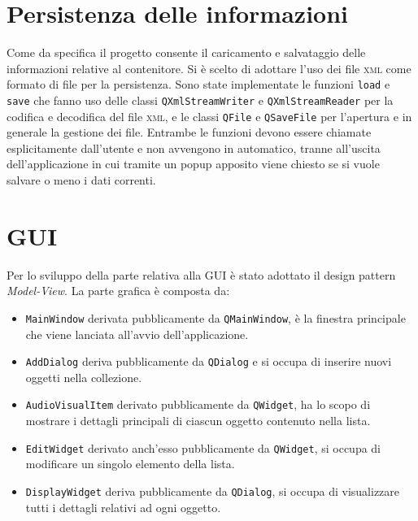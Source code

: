     \section*{Persistenza delle informazioni}
        Come da specifica il progetto consente il caricamento e salvataggio delle informazioni relative al contenitore. Si è scelto di adottare l'uso dei file \textsc{xml} come formato di file per la persistenza. \newline
        Sono state implementate le funzioni \texttt{load} e \texttt{save} che fanno uso delle classi \texttt{QXmlStreamWriter} e \texttt{QXmlStreamReader} per la codifica e decodifica del file \textsc{xml}, e le classi \texttt{QFile} e \texttt{QSaveFile} per l'apertura e in generale la gestione dei file. \newline
        Entrambe le funzioni devono essere chiamate esplicitamente dall'utente e non avvengono in automatico, tranne all'uscita dell'applicazione in cui tramite un popup apposito viene chiesto se si vuole salvare o meno i dati correnti.

    \section*{GUI}
        Per lo sviluppo della parte relativa alla GUI è stato adottato il design pattern \textit{Model-View}. \newline
        La parte grafica è composta da:
        \begin{itemize}
            \item \texttt{MainWindow} derivata pubblicamente da \texttt{QMainWindow}, è la finestra principale che viene lanciata all'avvio dell'applicazione.
            \item \texttt{AddDialog} deriva pubblicamente da \texttt{QDialog} e si occupa di inserire nuovi oggetti nella collezione.
            \item \texttt{AudioVisualItem} derivato pubblicamente da \texttt{QWidget}, ha lo scopo di mostrare i dettagli principali di ciascun oggetto contenuto nella lista.
            \item \texttt{EditWidget} derivato anch'esso pubblicamente da \texttt{QWidget}, si occupa di modificare un singolo elemento della lista.
            \item \texttt{DisplayWidget} deriva pubblicamente da \texttt{QDialog}, si occupa di visualizzare tutti i dettagli relativi ad ogni oggetto.
        \end{itemize}

